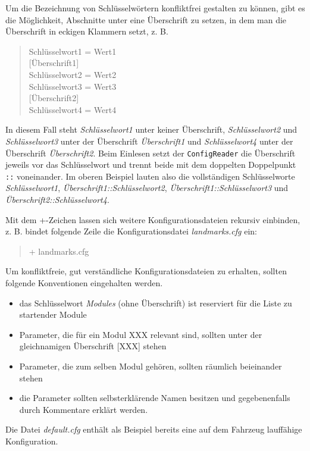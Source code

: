\documentclass[a4paper, 11pt]{article}
\newcommand{\code}[1]{\texttt{#1}}
\begin{document}
{Um die Bezeichnung von Schlüsselwörtern konfliktfrei gestalten zu können, gibt es die Möglichkeit, Abschnitte unter eine Überschrift zu setzen, in dem man die Überschrift in eckigen Klammern setzt, z. B.
\begin{quote}
\mbox{}Schlüsselwort1 = Wert1 \\
\mbox{}[Überschrift1] \\
\mbox{}Schlüsselwort2 = Wert2 \\
\mbox{}Schlüsselwort3 = Wert3 \\
\mbox{}[Überschrift2] \\
\mbox{}Schlüsselwort4 = Wert4
\end{quote}
In diesem Fall steht \textit{Schlüsselwort1} unter keiner Überschrift, \textit{Schlüsselwort2} und \textit{Schlüsselwort3} unter der Überschrift \textit{Überschrift1} und \textit{Schlüsselwort4} unter der Überschrift \textit{Überschrift2}. Beim Einlesen setzt der \code{ConfigReader} die Überschrift jeweils vor das Schlüsselwort und trennt beide mit dem doppelten Doppelpunkt \texttt{::} voneinander. Im oberen Beispiel lauten also die vollständigen Schlüsselworte \textit{Schlüsselwort1}, \textit{Überschrift1::Schlüsselwort2}, \textit{Überschrift1::Schlüsselwort3} und \textit{Überschrift2::Schlüsselwort4}.

Mit dem +-Zeichen lassen sich weitere Konfigurationsdateien rekursiv einbinden, z. B. bindet folgende Zeile die Konfigurationsdatei \textit{landmarks.cfg} ein:
\begin{quote}
+ landmarks.cfg
\end{quote}

Um konfliktfreie, gut verständliche Konfigurationsdateien zu erhalten, sollten folgende Konventionen eingehalten werden.
\begin{itemize}
\item das Schlüsselwort \textit{Modules} (ohne Überschrift) ist reserviert für die Liste zu startender Module
\item Parameter, die für ein Modul XXX relevant sind, sollten unter der gleichnamigen Überschrift [XXX] stehen
\item Parameter, die zum selben Modul gehören, sollten räumlich beieinander stehen
\item die Parameter sollten selbsterklärende Namen besitzen und gegebenenfalls durch Kommentare erklärt werden.
\end{itemize}

Die Datei \textit{default.cfg} enthält als Beispiel bereits eine auf dem Fahrzeug lauffähige Konfiguration.

}
\end{document}
